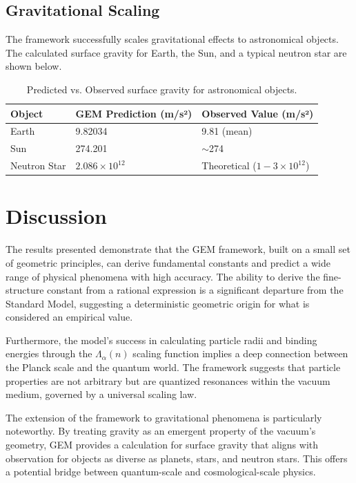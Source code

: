 \documentclass[12pt]{article}
\begin{document}
\subsection{Gravitational Scaling}

The framework successfully scales gravitational effects to astronomical objects. The calculated surface gravity for Earth, the Sun, and a typical neutron star are shown below.

\begin{table}[h!]
\centering
\begin{tabular}{|l|l|l|}
\hline
\textbf{Object} & \textbf{GEM Prediction (m/s²)} & \textbf{Observed Value (m/s²)} \\
\hline
Earth & 9.82034 & 9.81 (mean) \\
Sun & 274.201 & $\sim$274 \\
Neutron Star & $2.086 \times 10^{12}$ & Theoretical ($1-3 \times 10^{12}$) \\
\hline
\end{tabular}
\caption{Predicted vs. Observed surface gravity for astronomical objects.}
\label{tab:gravity}
\end{table}

\section{Discussion}

The results presented demonstrate that the GEM framework, built on a small set of geometric principles, can derive fundamental constants and predict a wide range of physical phenomena with high accuracy. The ability to derive the fine-structure constant from a rational expression is a significant departure from the Standard Model, suggesting a deterministic geometric origin for what is considered an empirical value.

Furthermore, the model's success in calculating particle radii and binding energies through the $\Lambda_\alpha(n)$ scaling function implies a deep connection between the Planck scale and the quantum world. The framework suggests that particle properties are not arbitrary but are quantized resonances within the vacuum medium, governed by a universal scaling law.

The extension of the framework to gravitational phenomena is particularly noteworthy. By treating gravity as an emergent property of the vacuum's geometry, GEM provides a calculation for surface gravity that aligns with observation for objects as diverse as planets, stars, and neutron stars. This offers a potential bridge between quantum-scale and cosmological-scale physics.
\end{document}
